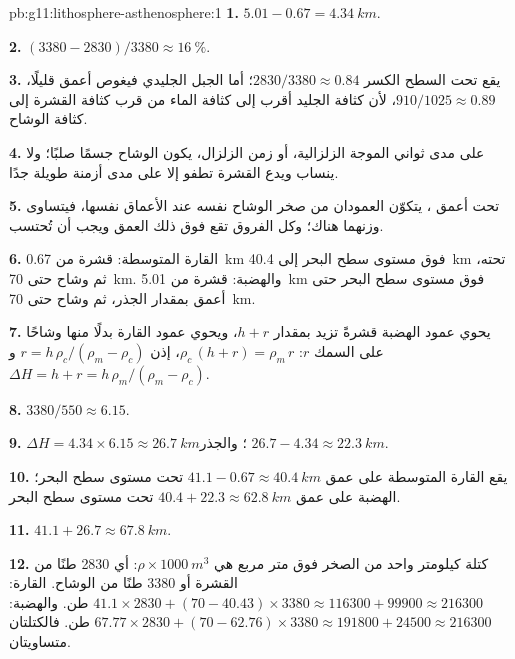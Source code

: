 \begin{solution}{pb:g11:lithosphere-asthenosphere:1}
\textbf{1.} $5.01 - 0.67 = \qty{4.34}{km}$.

\textbf{2.} $(3380 - 2830)/3380 \approx \qty{16}{\percent}$.

\textbf{3.} يقع تحت السطح الكسر $2830/3380 \approx 0.84$؛ أما الجبل
الجليدي فيغوص أعمق قليلًا، $910/1025 \approx 0.89$، لأن كثافة الجليد
أقرب إلى كثافة الماء من قرب كثافة القشرة إلى كثافة الوشاح.

\textbf{4.} على مدى ثواني الموجة الزلزالية، أو زمن
الزلزال، يكون الوشاح جسمًا صلبًا؛ ولا ينساب  ويدع القشرة تطفو
إلا على مدى أزمنة طويلة جدًا.

\textbf{5.} تحت أعمق ، يتكوّن العمودان من صخر الوشاح نفسه
عند الأعماق نفسها، فيتساوى وزنهما هناك؛ وكل الفروق
تقع فوق ذلك العمق ويجب أن تُحتسب.

\textbf{6.} القارة المتوسطة: قشرة من \qty{0.67}{km} فوق مستوى سطح البحر إلى
\qty{40.4}{km} تحته، ثم وشاح حتى \qty{70}{km}. والهضبة:
قشرة من \qty{5.01}{km} فوق مستوى سطح البحر حتى  أعمق بمقدار
الجذر، ثم وشاح حتى \qty{70}{km}.

\textbf{7.} يحوي عمود الهضبة قشرةً تزيد بمقدار $h + r$، ويحوي عمود القارة
بدلًا منها وشاحًا على السمك $r$: $\rho_c\,(h + r) = \rho_m\,r$،
إذن $r = h\,\rho_c/(\rho_m - \rho_c)$ و$\Delta H = h + r =
h\,\rho_m/(\rho_m - \rho_c)$.

\textbf{8.} $3380/550 \approx 6.15$.

\textbf{9.} $\Delta H = 4.34 \times 6.15 \approx \qty{26.7}{km}$؛ والجذر
$26.7 - 4.34 \approx \qty{22.3}{km}$.

\textbf{10.} يقع  القارة المتوسطة على عمق $41.1 - 0.67 \approx
\qty{40.4}{km}$ تحت مستوى سطح البحر؛  الهضبة على عمق $40.4 + 22.3 \approx
\qty{62.8}{km}$ تحت مستوى سطح البحر.

\textbf{11.} $41.1 + 26.7 \approx \qty{67.8}{km}$.

\textbf{12.} كتلة كيلومتر واحد من الصخر فوق متر مربع هي
$\rho \times \qty{1000}{m^3}$: أي \num{2830} طنًا من القشرة أو \num{3380}
طنًا من الوشاح. القارة: $41.1 \times 2830 + (70 - 40.43) \times 3380
\approx \num{116300} + \num{99900} \approx \num{216300}$ طن. والهضبة:
$67.77 \times 2830 + (70 - 62.76) \times 3380 \approx \num{191800} +
\num{24500} \approx \num{216300}$ طن. فالكتلتان متساويتان.


\end{solution}
